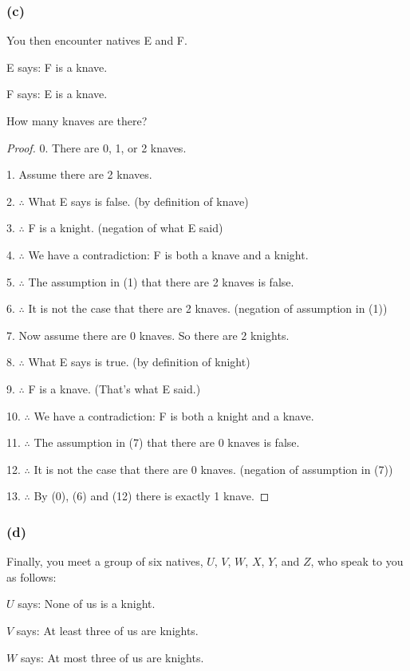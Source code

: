 \documentclass[14pt]{extarticle}
\begin{document}
\subsubsection{(c)} 
You then encounter natives E and F.

E says: F is a knave.

F says: E is a knave.

How many knaves are there?

\begin{proof} 
0. There are 0, 1, or 2 knaves.

1. Assume there are 2 knaves.

2. $\therefore$ What E says is false. (by definition of knave)

3. $\therefore$ F is a knight. (negation of what E said)

4. $\therefore$ We have a contradiction: F is both a knave and a knight.

5. $\therefore$ The assumption in (1) that there are 2 knaves is false.

6. $\therefore$ It is not the case that there are 2 knaves. (negation of assumption in (1))

7. Now assume there are 0 knaves. So there are 2 knights.

8. $\therefore$ What E says is true. (by definition of knight)

9. $\therefore$ F is a knave. (That's what E said.)

10. $\therefore$ We have a contradiction: F is both a knight and a knave.

11. $\therefore$ The assumption in (7) that there are 0 knaves is false.

12. $\therefore$ It is not the case that there are 0 knaves. (negation of assumption in (7))

13. $\therefore$ By (0), (6) and (12) there is exactly 1 knave. \end{proof}

\subsubsection{(d)} 
Finally, you meet a group of six natives, $U$, $V$, $W$, $X$, $Y$, and $Z$, who speak to you as follows:

$U$ says: None of us is a knight.

$V$ says: At least three of us are knights.

$W$ says: At most three of us are knights.
\end{document}
